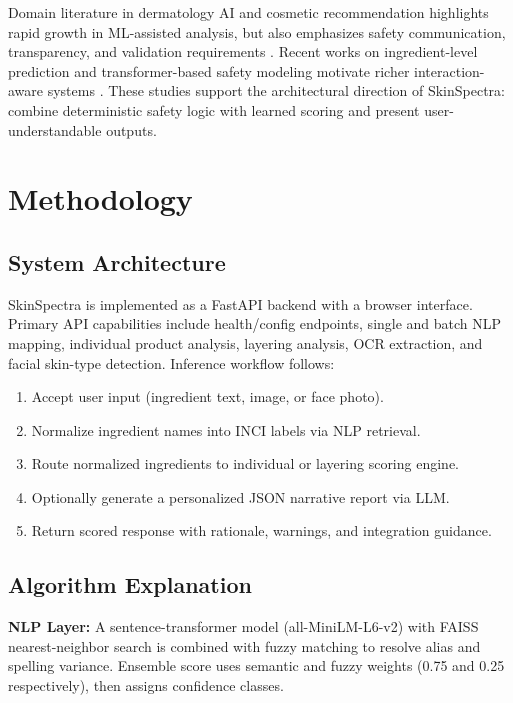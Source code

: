\documentclass[a4paper,fleqn]{cas-sc}
\begin{document}
Domain literature in dermatology AI and cosmetic recommendation highlights rapid growth in ML-assisted analysis, but also emphasizes safety communication, transparency, and validation requirements \citep{adegun2021survey,shetty2023ai,kim2022personalized,liu2022skintype}. Recent works on ingredient-level prediction and transformer-based safety modeling motivate richer interaction-aware systems \citep{zhao2023ingredient,park2024transformer}. These studies support the architectural direction of SkinSpectra: combine deterministic safety logic with learned scoring and present user-understandable outputs.

\section{Methodology}\label{sec:method}
\subsection{System Architecture}
SkinSpectra is implemented as a FastAPI backend with a browser interface. Primary API capabilities include health/config endpoints, single and batch NLP mapping, individual product analysis, layering analysis, OCR extraction, and facial skin-type detection. Inference workflow follows:

\begin{enumerate}
\item Accept user input (ingredient text, image, or face photo).
\item Normalize ingredient names into INCI labels via NLP retrieval.
\item Route normalized ingredients to individual or layering scoring engine.
\item Optionally generate a personalized JSON narrative report via LLM.
\item Return scored response with rationale, warnings, and integration guidance.
\end{enumerate}

\subsection{Algorithm Explanation}
\textbf{NLP Layer:} A sentence-transformer model (all-MiniLM-L6-v2) with FAISS nearest-neighbor search is combined with fuzzy matching to resolve alias and spelling variance. Ensemble score uses semantic and fuzzy weights (0.75 and 0.25 respectively), then assigns confidence classes.
\end{document}
